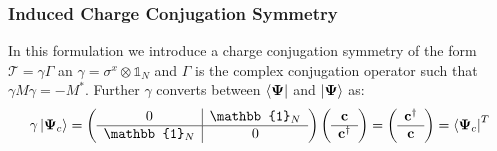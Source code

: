 \documentclass[Master]{subfiles}
\begin{document}
\subsubsection{Induced Charge Conjugation Symmetry}\label{sec:indChegeConjSym}
In this formulation we introduce a charge conjugation symmetry of the form $\mathcal{T} = \gamma \Gamma$ an $\gamma = \sigma^x \otimes \mathbb{1}_N$ and $\Gamma$ is the complex conjugation operator such that $\gamma M \gamma = - M^{*}$. Further $\gamma$ converts between $\bra{\mathbf{\Psi}}$ and $\ket{\mathbf{\Psi}}$ as:
$$
\gamma\ket{\vec{\Psi}_c} =  
\left(\begin{array}{c|c}
       0 & \mathbb{1}_N\\
       \hline
        \mathbb{1}_N & 0
\end{array}\right)
\left(\begin{array}{c}
       \vec{c}\\
       \hline
        \vec{c}^{\dag}
\end{array}\right) = 
\left(\begin{array}{c}
       \vec{c}^{\dag}\\
       \hline
        \vec{c}
\end{array}\right) = \bra{\vec{\Psi}_c}^T
$$
\end{document}
